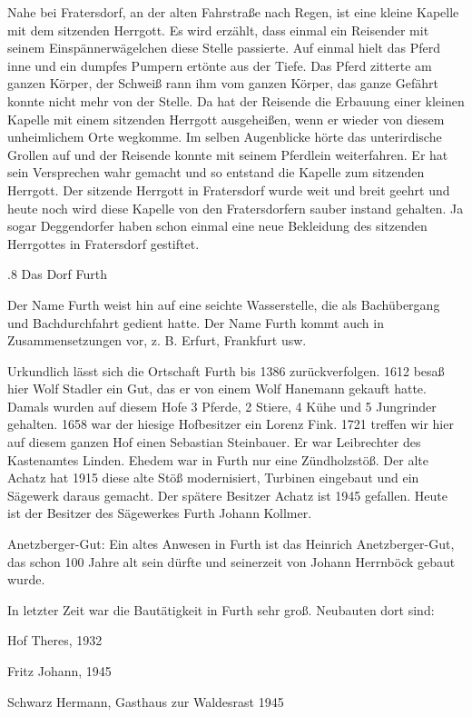 \documentclass{book}
\begin{document}
Nahe bei Fratersdorf, an der alten Fahrstraße nach Regen, ist eine kleine
Kapelle mit dem sitzenden Herrgott. Es wird erzählt, dass einmal ein Reisender
mit seinem Einspännerwägelchen diese Stelle passierte. Auf einmal hielt das
Pferd inne und ein dumpfes Pumpern ertönte aus der Tiefe. Das Pferd zitterte am
ganzen Körper, der Schweiß rann ihm vom ganzen Körper, das ganze Gefährt konnte
nicht mehr von der Stelle. Da hat der Reisende die Erbauung einer kleinen
Kapelle mit einem sitzenden Herrgott ausgeheißen, wenn er wieder von diesem
unheimlichem Orte wegkomme. Im selben Augenblicke hörte das unterirdische
Grollen auf und der Reisende konnte mit seinem Pferdlein weiterfahren. Er hat
sein Versprechen wahr gemacht und so entstand die Kapelle zum sitzenden
Herrgott. Der sitzende Herrgott in Fratersdorf wurde weit und breit geehrt und
heute noch wird diese Kapelle von den Fratersdorfern sauber instand gehalten. Ja
sogar Deggendorfer haben schon einmal eine neue Bekleidung des sitzenden
Herrgottes in Fratersdorf gestiftet.

.8 Das Dorf Furth

Der Name Furth weist hin auf eine seichte Wasserstelle, die als Bachübergang und
Bachdurchfahrt gedient hatte. Der Name Furth kommt auch in Zusammensetzungen
vor, z. B. Erfurt, Frankfurt usw.

Urkundlich lässt sich die Ortschaft Furth bis 1386 zurückverfolgen. 1612 besaß
hier Wolf Stadler ein Gut, das er von einem Wolf Hanemann gekauft hatte. Damals
wurden auf diesem Hofe 3 Pferde, 2 Stiere, 4 Kühe und 5 Jungrinder gehalten.
1658 war der hiesige Hofbesitzer ein Lorenz Fink. 1721 treffen wir hier auf
diesem ganzen Hof einen Sebastian Steinbauer. Er war Leibrechter des Kastenamtes
Linden. Ehedem war in Furth nur eine Zündholzstöß. Der alte Achatz hat 1915
diese alte Stöß modernisiert, Turbinen eingebaut und ein Sägewerk daraus
gemacht. Der spätere Besitzer Achatz ist 1945 gefallen. Heute ist der Besitzer
des Sägewerkes Furth Johann Kollmer.

Anetzberger-Gut: Ein altes Anwesen in Furth ist das Heinrich Anetzberger-Gut,
das schon 100 Jahre alt sein dürfte und seinerzeit von Johann Herrnböck gebaut
wurde.

In letzter Zeit war die Bautätigkeit in Furth sehr groß. Neubauten dort sind:



Hof Theres, 1932

Fritz Johann, 1945

Schwarz Hermann, Gasthaus zur Waldesrast 1945
\end{document}
